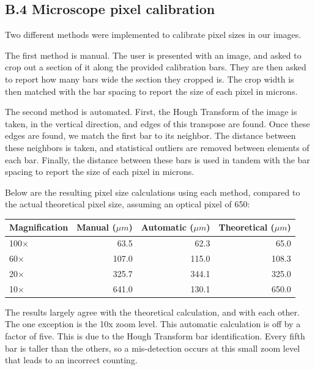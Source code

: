 \documentclass{article}
\begin{document}
\subsection*{B.4 Microscope pixel calibration}
 
Two different methods were implemented to calibrate pixel sizes in our images.

The first method is manual. The user is presented with an image, and asked to crop out a section of it along the provided calibration bars. They are then asked to report how many bars wide the section they cropped is. The crop width is then matched with the bar spacing to report the size of each pixel in microns.

The second method is automated. First, the Hough Transform of the image is taken, in the vertical direction, and edges of this transpose are found. Once these edges are found, we match the first bar to its neighbor. The distance between these neighbors is taken, and statistical outliers are removed between elements of each bar. Finally, the distance between these bars is used in tandem with the bar spacing to report the size of each pixel in microns.

Below are the resulting pixel size calculations using each method, compared to the actual theoretical pixel size, assuming an optical pixel of \unit{650}{\nano\meter}:

\begin{center}
\begin{tabular}{l | r | r | r}
     Magnification & Manual ($\mu m$) & Automatic ($\mu m$) & Theoretical ($\mu m$) \\
     \hline\hline
     100$\times$                & 63.5            & 62.3               & 65.0 \\ \hline
     60$\times$                 & 107.0           & 115.0              & 108.3 \\ \hline
     20$\times$                 & 325.7           & 344.1              & 325.0 \\ \hline
     10$\times$                 & 641.0           & 130.1              & 650.0
\end{tabular}
\end{center}

The results largely agree with the theoretical calculation, and with each other. The one exception is the 10x zoom level. This automatic calculation is off by a factor of five. This is due to the Hough Transform bar identification. Every fifth bar is taller than the others, so a mis-detection occurs at this small zoom level that leads to an incorrect counting.
\end{document}
